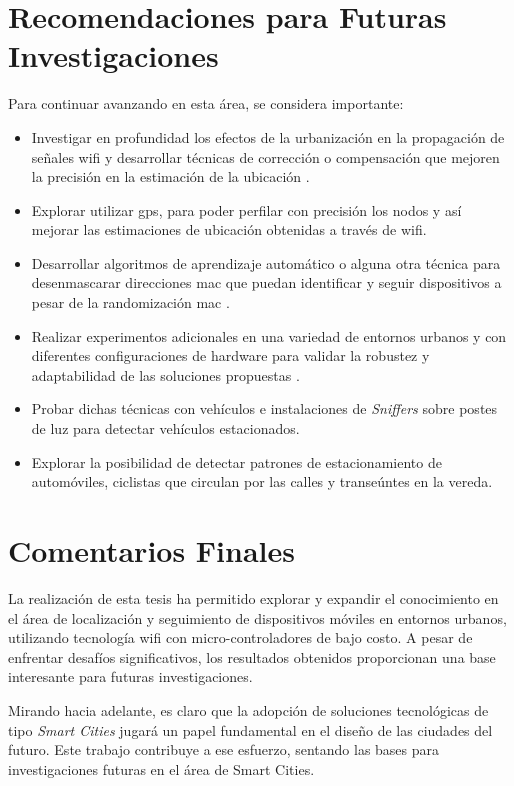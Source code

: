 \section{Recomendaciones para Futuras Investigaciones}
Para continuar avanzando en esta área, se considera importante:

\begin{itemize}
    \item Investigar en profundidad los efectos de la urbanización en la propagación de señales \acs{wifi} y desarrollar técnicas de corrección o compensación que mejoren la precisión en la estimación de la ubicación \cite{choi_2019_unsupervised}.
    \item Explorar utilizar \acs{gps}, para poder perfilar con precisión los nodos y así mejorar las estimaciones de ubicación obtenidas a través de \acs{wifi}.
    \item Desarrollar algoritmos de aprendizaje automático o alguna otra técnica para desenmascarar direcciones \acs{mac} que puedan identificar y seguir dispositivos a pesar de la randomización \acs{mac} \cite{baccichet2024mac}.
    \item Realizar experimentos adicionales en una variedad de entornos urbanos y con diferentes configuraciones de hardware para validar la robustez y adaptabilidad de las soluciones propuestas \cite{10.1007-978-3-030-11027}.
    \item Probar dichas técnicas con vehículos e instalaciones de \textit{Sniffers} sobre postes de luz para detectar vehículos estacionados\cite{yuansmartparking}.
    \item Explorar la posibilidad de detectar patrones de estacionamiento de automóviles, ciclistas que circulan por las calles y transeúntes en la vereda.
\end{itemize}

\section{Comentarios Finales}

La realización de esta tesis ha permitido explorar y expandir el conocimiento en el área de localización y seguimiento de dispositivos móviles en entornos urbanos, utilizando tecnología \acs{wifi} con micro-controladores de bajo costo. A pesar de enfrentar desafíos significativos, los resultados obtenidos proporcionan una base interesante para futuras investigaciones.

Mirando hacia adelante, es claro que la adopción de soluciones tecnológicas de tipo \textit{Smart Cities} jugará un papel fundamental en el diseño de las ciudades del futuro. Este trabajo contribuye a ese esfuerzo, sentando las bases para investigaciones futuras en el área de Smart Cities.